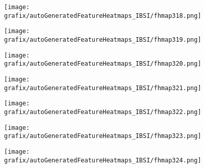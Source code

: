 \begin{subfigure}{\wid\textwidth} 
    \centering 
    \caption{\tiny \sffamily {}} 
    \vspace{\vsp} 
    \texttt{[image: grafix/autoGeneratedFeatureHeatmaps\_IBSI/fhmap318.png]} 
\end{subfigure} 
\hspace{\hsp} 
\begin{subfigure}{\wid\textwidth} 
    \centering 
    \caption{\tiny \sffamily {}} 
    \vspace{\vsp} 
    \texttt{[image: grafix/autoGeneratedFeatureHeatmaps\_IBSI/fhmap319.png]} 
\end{subfigure} 
\hspace{\hsp} 
\begin{subfigure}{\wid\textwidth} 
    \centering 
    \caption{\tiny \sffamily {}} 
    \vspace{\vsp} 
    \texttt{[image: grafix/autoGeneratedFeatureHeatmaps\_IBSI/fhmap320.png]} 
\end{subfigure} 
\hspace{\hsp} 
\begin{subfigure}{\wid\textwidth} 
    \centering 
    \caption{\tiny \sffamily {}} 
    \vspace{\vsp} 
    \texttt{[image: grafix/autoGeneratedFeatureHeatmaps\_IBSI/fhmap321.png]} 
\end{subfigure} 
\hspace{\hsp} 
\begin{subfigure}{\wid\textwidth} 
    \centering 
    \caption{\tiny \sffamily {}} 
    \vspace{\vsp} 
    \texttt{[image: grafix/autoGeneratedFeatureHeatmaps\_IBSI/fhmap322.png]} 
\end{subfigure} 
\hspace{\hsp} 
\begin{subfigure}{\wid\textwidth} 
    \centering 
    \caption{\tiny \sffamily {}} 
    \vspace{\vsp} 
    \texttt{[image: grafix/autoGeneratedFeatureHeatmaps\_IBSI/fhmap323.png]} 
\end{subfigure} 
\hspace{\hsp} 
\begin{subfigure}{\wid\textwidth} 
    \centering 
    \caption{\tiny \sffamily {}} 
    \vspace{\vsp} 
    \texttt{[image: grafix/autoGeneratedFeatureHeatmaps\_IBSI/fhmap324.png]} 
\end{subfigure} 

